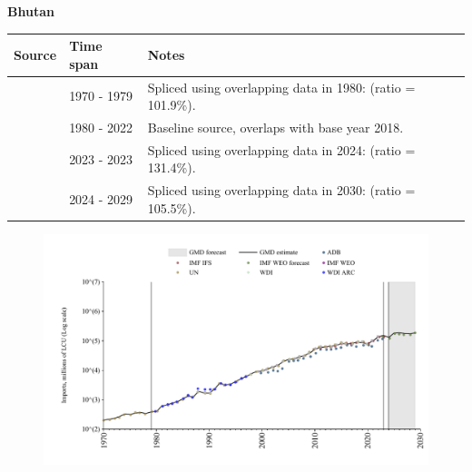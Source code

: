\documentclass[12pt,a4paper,landscape]{article}
\begin{document}
\begin{adjustbox}{max totalsize={\paperwidth}{\paperheight},center}
\begin{minipage}[t][\textheight][t]{\textwidth}
\vspace*{0.5cm}
{}
\begin{center}
{\Large\bfseries Bhutan}
\end{center}
\vspace{0.5cm}
\begin{table}[H]
\centering
\small
\begin{tabular}{|l|l|l|}
\hline
\textbf{Source} & \textbf{Time span} & \textbf{Notes} \\
\hline
\rowcolor{white}\cite{UN}& 1970 - 1979 &Spliced using overlapping data in 1980: (ratio = 101.9\%).\\
\rowcolor{lightgray}\cite{WDI}& 1980 - 2022 &Baseline source, overlaps with base year 2018.\\
\rowcolor{white}\cite{ADB}& 2023 - 2023 &Spliced using overlapping data in 2024: (ratio = 131.4\%).\\
\rowcolor{lightgray}\cite{IMF_WEO_forecast}& 2024 - 2029 &Spliced using overlapping data in 2030: (ratio = 105.5\%).\\
\hline
\end{tabular}
\end{table}
\begin{figure}[H]
\centering
\includegraphics[width=\textwidth,height=0.6\textheight,keepaspectratio]{graphs/BTN_imports.pdf}
\end{figure}
\end{minipage}
\end{adjustbox}
\end{document}
